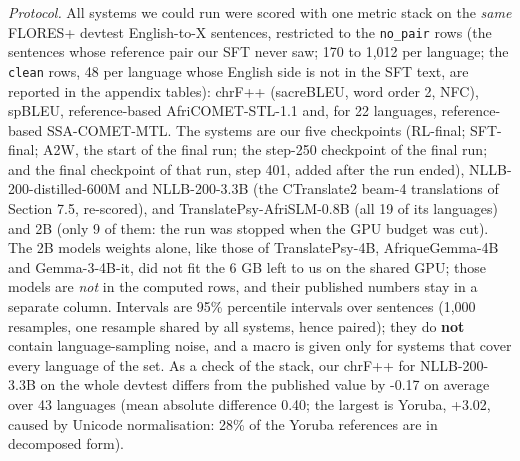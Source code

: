 \emph{Protocol.} All systems we could run were scored with one metric stack on the \emph{same} FLORES+ devtest English-to-X sentences, restricted to the \texttt{no\_pair} rows (the sentences whose reference pair our SFT never saw; 170 to 1,012 per language; the \texttt{clean} rows, 48 per language whose English side is not in the SFT text, are reported in the appendix tables): chrF++ (sacreBLEU, word order 2, NFC), spBLEU, reference-based AfriCOMET-STL-1.1 and, for 22 languages, reference-based SSA-COMET-MTL. The systems are our five checkpoints (RL-final; SFT-final; A2W, the start of the final run; the step-250 checkpoint of the final run; and the final checkpoint of that run, step 401, added after the run ended), NLLB-200-distilled-600M and NLLB-200-3.3B (the CTranslate2 beam-4 translations of Section 7.5, re-scored), and TranslatePsy-AfriSLM-0.8B (all 19 of its languages) and 2B (only 9 of them: the run was stopped when the GPU budget was cut). The 2B model\textquotesingle s weights alone, like those of TranslatePsy-4B, AfriqueGemma-4B and Gemma-3-4B-it, did not fit the 6 GB left to us on the shared GPU; those models are \emph{not} in the computed rows, and their published numbers stay in a separate column. Intervals are 95\% percentile intervals over sentences (1,000 resamples, one resample shared by all systems, hence paired); they do \textbf{not} contain language-sampling noise, and a macro is given only for systems that cover every language of the set. As a check of the stack, our chrF++ for NLLB-200-3.3B on the whole devtest differs from the published value by -0.17 on average over 43 languages (mean absolute difference 0.40; the largest is Yoruba, +3.02, caused by Unicode normalisation: 28\% of the Yoruba references are in decomposed form).

